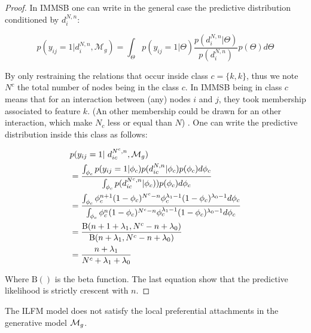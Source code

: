 \begin{proof}
In IMMSB one can write in the general case the predictive distribution conditioned by $d_i^{N,n}$:

\begin{equation} 
p(y_{ij} = 1 | d_i^{N,n}, \mathcal{M}_g) = \int_{\Theta} p(y_{ij}=1|\Theta) \frac{p(d_i^{N,n} | \Theta)}{p(d_i^{N,n})} p(\Theta) d\Theta \nonumber
\end{equation}

By only restraining the relations that occur inside class $c=\{k,k\}$, thus we note $N^c$ the total number of nodes being in the class $c$. In IMMSB being in class $c$ means that for an interaction between (any) nodes $i$ and $j$, they took membership associated to feature $k$.   (An other membership could be drawn for an other interaction, which make $N_c$ less or equal than $N$) . One can write the predictive distribution inside this class as follows:

\begin{align*} \label{eq:sum}
&p(y_{ij} = 1 | d_{ic}^{N^c,n}, \mathcal{M}_g)  \\
&=  \frac{ \int_{\phi_{c}} p(y_{ij}=1|\phi_{c}) p(d_{ic}^{N,n} | \phi_{c}) p(\phi_{c}) d\phi_{c}}{\int_{\phi_{c}} \p(d_{ic}^{N^c,n} | \phi_{c}))       p(\phi_{c}) d\phi_{c}}   \\
&= \frac{\int_{\phi_c} \phi_c^{n+1}(1-\phi_c)^{N^c-n} \phi_c^{\lambda_1-1} (1-\phi_c)^{\lambda_0-1} d\phi_{c}}{\int_{\phi_c} \phi_c^{n}(1-\phi_c)^{N^c-n} \phi_c^{\lambda_1-1} (1-\phi_c)^{\lambda_0-1} d\phi_{c}} \\
&= \frac{ \text{B}(n+1+\lambda_1, N^c-n+\lambda_0) }{\text{B}(n+\lambda_1, N^c-n+\lambda_0)} \\
&= \frac{n+\lambda_1}{N^c + \lambda_1 +\lambda_0}
\end{align*}

Where $\text{B}()$ is the beta function. The last equation show that the predictive likelihood is strictly crescent with $n$.

\end{proof}

\begin{proposition}
	The ILFM model does not satisfy the local preferential attachments in the generative model $\mathcal{M}_g$.
\end{proposition}

